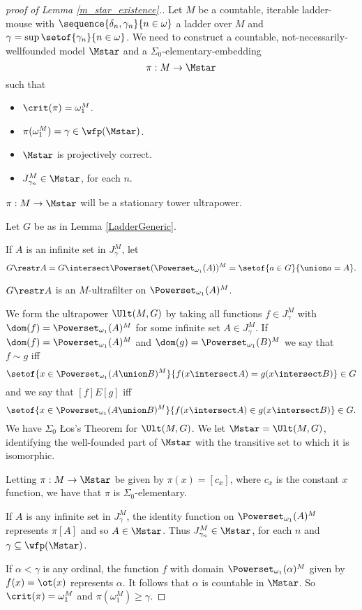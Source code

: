 \documentclass[oneside,12pt]{amsart}
\begin{document}
\begin{proof}[proof of Lemma \ref{m_star_existence}.]
Let $M$ be a countable, iterable ladder-mouse
with $\sequence{\delta_n,\gamma_n}{n\in\omega}$ a ladder over $M$ and
$\gamma=\sup\setof{\gamma_n}{n\in\omega}$. We need to construct a countable,
not-necessarily-wellfounded model $\Mstar$ and a $\Sigma_0$-elementary-embedding
$$\pi:M\to\Mstar$$
such that
\begin{itemize}
\item $\crit(\pi) = \omega_1^M$.
\item $\pi(\omega_1^M) = \gamma \in \wfp(\Mstar)$.
\item $\Mstar$ is projectively correct.
\item $J^{M}_{\gamma_n}\in\Mstar$, for each $n$.
\end{itemize}

$\pi:M\to\Mstar$ will be a stationary tower ultrapower.

Let $G$ be as in Lemma \ref{LadderGeneric}.

If $A$ is an infinite set in $J^M_{\gamma}$, let
$$G\restr A = G \intersect  \Powerset(\Powerset_{\omega_1}(A))^M = \setof{a\in G}{\union a = A}.$$

$G\restr A$ is an $M$-ultrafilter on $\Powerset_{\omega_1}(A)^M$.

We form the ultrapower $\Ult(M,G)$ by taking all functions $f\in J^M_{\gamma}$ with $\dom(f)=\Powerset_{\omega_1}(A)^M$ for some infinite set $A\in J^M_{\gamma}$.
If $\dom(f)=\Powerset_{\omega_1}(A)^M$ and  $\dom(g)=\Powerset_{\omega_1}(B)^M$ we say that $f\sim g$ iff
$$\setof{x\in \Powerset_{\omega_1}(A\union B)^M}{f(x\intersect A) = g(x\intersect B)} \in G$$
and we say that $[f] E [g]$ iff
$$\setof{x\in \Powerset_{\omega_1}(A\union B)^M}{f(x\intersect A) \in g(x\intersect B)} \in G.$$
We have $\Sigma_0$ \L{}os's Theorem for $\Ult(M,G)$.
We let $\Mstar=\Ult(M,G)$, identifying the well-founded part of $\Mstar$ with the transitive set to which it is isomorphic.

Letting $\pi:M\to\Mstar$ be given by $\pi(x)=[c_x]$, where $c_x$ is the constant $x$ function, we have that $\pi$ is $\Sigma_0$-elementary.

If $A$ is any infinite set in $J^M_{\gamma}$, the identity function on $\Powerset_{\omega_1}(A)^M$ represents $\pi[A]$ and so $A\in \Mstar$.
Thus $J^{M}_{\gamma_n}\in\Mstar$, for each $n$ and $\gamma\subseteq\wfp(\Mstar)$.

If $\alpha<\gamma$ is any ordinal, the function $f$ with domain $\Powerset_{\omega_1}(\alpha)^M$ given by $f(x)=\ot(x)$ represents $\alpha$. It
follows that $\alpha$ is countable in $\Mstar$. So $\crit(\pi)=\omega_1^M$ and $\pi(\omega_1^M)\geq \gamma$.


\end{proof}
\end{document}
